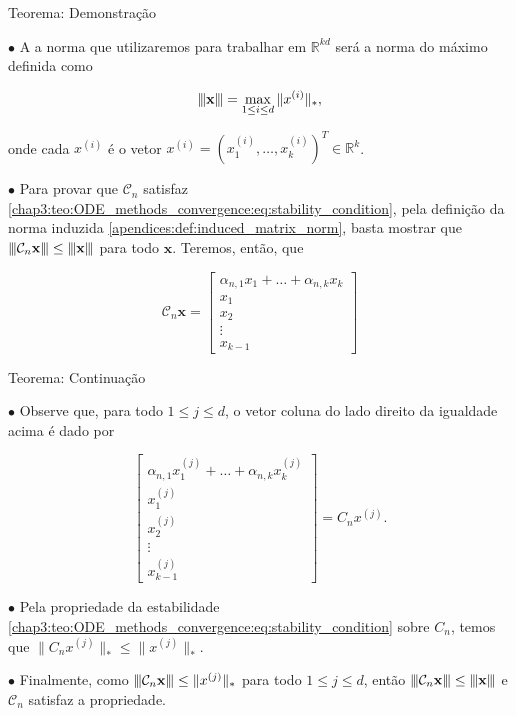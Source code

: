 \documentclass{beamer}
\newcommand{\vertiii}[1]{{\left\vert\kern-0.25ex\left\vert\kern-0.25ex\left\vert #1 
    \right\vert\kern-0.25ex\right\vert\kern-0.25ex\right\vert}}
\newcommand{\R}{\mathbb{R}}
\theoremstyle{plain}
\theoremstyle{definition}
\begin{document}

\begin{frame}{Teorema: Demonstração}


    \phantom{aa} $\bullet$ A a norma que utilizaremos para trabalhar em $\R^{kd}$ será a norma do máximo definida como
    
    \begin{equation}
      \vertiii{\mathbf{x}} = \max_{1 \leq i \leq d} \|x^{(i)}\|_* ,
      \label{chap3:teo:ODE_methods_convergence:eq:norm}
    \end{equation}
 
    \noindent
    onde cada \(x^{(i)}\) é o vetor $x^{(i)} = (x_1 ^{(i)}, \dots, x_k ^{(i)})^T \in \R^k$.


    \phantom{aa} $\bullet$ Para provar que $\mathcal{C}_n$ satisfaz \eqref{chap3:teo:ODE_methods_convergence:eq:stability_condition}, pela definição da norma induzida \ref{apendices:def:induced_matrix_norm}, basta mostrar que $\vertiii{ \mathcal{C}_n \mathbf{x}} \leq \vertiii{\mathbf{x}}$ para todo $\mathbf{x}$. Teremos, então, que


    \[
      \mathcal{C}_{n} \mathbf{x}  = 
      \begin{bmatrix}
        \alpha_{n,1}x_1 + \dots + \alpha_{n, k} x_k \\
        x_1 \\
        x_2 \\
        \vdots \\
        x_{k-1}
      \end{bmatrix}
    \]

\end{frame}



\begin{frame}{Teorema: Continuação}
    \small

    \phantom{aa} $\bullet$ Observe que, para todo $1 \leq j \leq d$, o vetor coluna do lado direito da igualdade acima é dado por

    \[
        \begin{bmatrix}
          \alpha_{n,1}x_1 ^{(j)} + \dots + \alpha_{n, k} x_k^{(j)} \\
          x_1^{(j)} \\
          x_2 ^{(j)}\\
          \vdots \\
          x_{k-1}^{(j)}
        \end{bmatrix}
        = 
          C_n x^{(j)}.
    \]

    \phantom{aa} $\bullet$ Pela propriedade da estabilidade \eqref{chap3:teo:ODE_methods_convergence:eq:stability_condition} sobre $C_n$, temos que $\| C_n x^{(j)} \|_* \leq \| x^{(j)} \|_*$. 

    \phantom{aa} $\bullet$ Finalmente, como $\vertiii{ \mathcal{C}_{n} \mathbf{x}} \leq \|x^{(j)}\|_*$ para todo $1 \leq j \leq d$, então $\vertiii{ \mathcal{C}_{n} \mathbf{x}} \leq \vertiii{\mathbf{x}}$ e $\mathcal{C}_n$ satisfaz a propriedade.
\end{frame}
\end{document}
